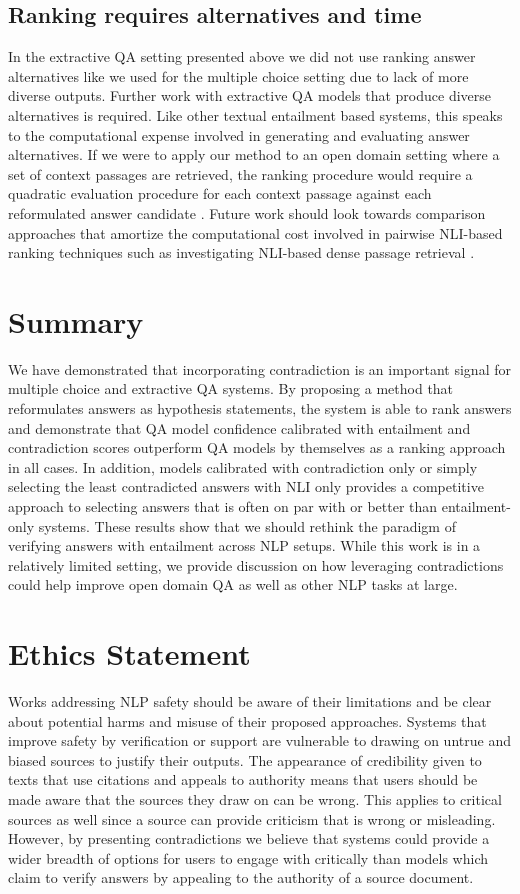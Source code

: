 \documentclass[11pt]{article}
\begin{document}
\subsection{Ranking requires alternatives and time}
In the extractive QA setting presented above we did not use ranking answer alternatives like we used for the multiple choice setting due to lack of more diverse outputs. Further work with extractive QA models that produce diverse alternatives is required. Like other textual entailment based systems, this speaks to the computational expense involved in generating and evaluating answer alternatives. If we were to apply our method to an open domain setting where a set of context passages are retrieved, the ranking procedure would require a quadratic evaluation procedure for each context passage against each reformulated answer candidate \citep{schuster_stretching_2022}. Future work should look towards comparison approaches that amortize the computational cost involved in pairwise NLI-based ranking techniques such as investigating NLI-based dense passage retrieval \citep{reimers_sentence-bert_2019}.
\section{Summary}
We have demonstrated that incorporating contradiction is an important signal for multiple choice and extractive QA systems. By proposing a method that reformulates answers as hypothesis statements, the system is able to rank answers and demonstrate that QA model confidence calibrated with entailment and contradiction scores outperform QA models by themselves as a ranking approach in all cases. In addition, models calibrated with contradiction only or simply selecting the least contradicted answers with NLI only provides a competitive approach to selecting answers that is often on par with or better than entailment-only systems. These results show that we should rethink the paradigm of verifying answers with entailment across NLP setups. While this work is in a relatively limited setting, we provide discussion on how leveraging contradictions could help improve open domain QA as well as other NLP tasks at large.
\section{Ethics Statement}
Works addressing NLP safety should be aware of their limitations and be clear about potential harms and misuse of their proposed approaches. Systems that improve safety by verification or support are vulnerable to drawing on untrue and biased sources to justify their outputs. The appearance of credibility given to texts that use citations and appeals to authority means that users should be made aware that the sources they draw on can be wrong. This applies to critical sources as well since a source can provide criticism that is wrong or misleading. However, by presenting contradictions we believe that systems could provide a wider breadth of options for users to engage with critically than models which claim to verify answers by appealing to the authority of a source document.


\appendix
\end{document}
